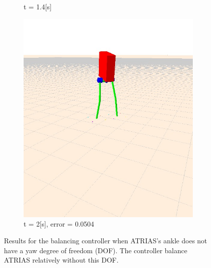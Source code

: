 \documentclass[letterpaper, 10 pt, conference]{ieeeconf}  %
\begin{document}
\begin{figure}[tbp]
\begin{subfigure}[b]{0.3\textwidth}
    \caption{t = 1.4[s]}
    \label{fig:balanceNoYaw2}
  \end{subfigure}\hfill
  \begin{subfigure}[b]{0.3\textwidth}
    \centering
    \includegraphics[width=\textwidth] {figures/balanceNoYaw3.jpg} 
    \caption{t = 2[s], error = 0.0504}
    \label{fig:balanceNoYaw3}
  \end{subfigure}
  \caption{Results for the balancing controller when ATRIAS's ankle does not have a yaw degree of freedom (DOF). The controller balance ATRIAS relatively without this DOF. }
  \label{fig:balancing}
\end{figure}
\end{document}
